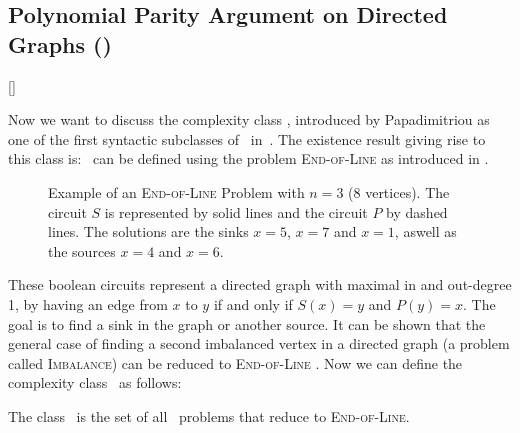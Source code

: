 \subsection{Polynomial Parity Argument on Directed Graphs (\PPAD)}[\PPAD]

Now we want to discuss the complexity class \PPAD, introduced by Papadimitriou as one of the first syntactic subclasses of \TFNP\ in~. The existence result giving rise to this class is: 
\PPAD\ can be defined using the problem \textsc{End-of-Line} as introduced in .


\begin{figure}[ht]
    \centering
    \caption[Example of an \textsc{End-of-Line} Problem]{Example of an \textsc{End-of-Line} Problem with $n=3$ (8 vertices).
        The circuit $S$ is represented by solid lines and the circuit $P$ by dashed lines.
        The solutions are the sinks $x=5$, $x=7$ and $x=1$, aswell as the sources $x=4$ and $x=6$.}
    \label{fig:ppad_example}
\end{figure}

These boolean circuits represent a directed graph with maximal in and out-degree 1, by having an edge from $x$ to $y$ if and only if $S(x) = y$  and $P(y) =
    x$.
The goal is to find a sink in the graph or another source.
It can be shown that the general case of finding a second imbalanced vertex in a directed graph (a problem called \textsc{Imbalance}) can be reduced to
\textsc{End-of-Line} .
Now we can define the complexity class \PPAD\ as follows:

\begin{definition}[\PPAD]
    The class \PPAD\ is the set of all \TFNP\ problems that reduce to \textsc{End-of-Line}.
\end{definition}

